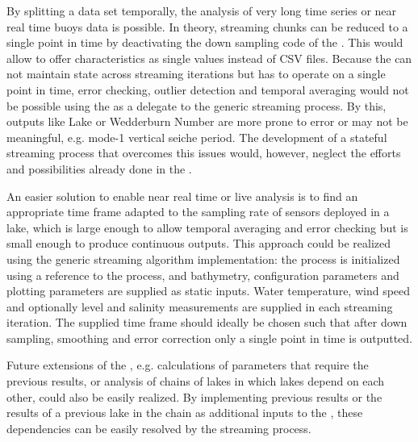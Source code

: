   By splitting a data set temporally, the analysis of very long time series or near real time buoys data is possible. In theory, streaming chunks can be reduced to a single point in time by deactivating the down sampling code of the \la. This would allow to offer characteristics as single values instead of \ac{CSV} files. Because the \la can not maintain state across streaming iterations but has to operate on a single point in time, error checking, outlier detection and temporal averaging would not be possible using the \la as a delegate to the generic streaming process. By this, outputs like Lake or Wedderburn Number are more prone to error or may not be meaningful, e.g. mode-1 vertical seiche period. The development of a stateful streaming process that overcomes this issues would, however, neglect the efforts and possibilities already done in the \la.

  An easier solution to enable near real time or live analysis is to find an appropriate time frame adapted to the sampling rate of sensors deployed in a lake, which is large enough to allow temporal averaging and error checking but is small enough to produce continuous outputs. This approach could be realized using the generic streaming algorithm implementation: the process is initialized using a reference to the \la process, and bathymetry, configuration parameters and plotting parameters are supplied as static inputs. Water temperature, wind speed and optionally level and salinity measurements are supplied in each streaming iteration. The supplied time frame should ideally be chosen such that after down sampling, smoothing and error correction only a single point in time is outputted.

  Future extensions of the \la, e.g. calculations of parameters that require the previous results, or analysis of chains of lakes in which lakes depend on each other, could also be easily realized. By implementing previous results or the results of a previous lake in the chain as additional inputs to the \la, these dependencies can be easily resolved by the streaming process.